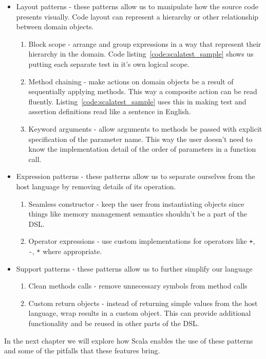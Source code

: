 \begin{itemize}
	\item Layout patterns - these patterns allow us to manipulate how the source code presents visually. Code layout can represent a hierarchy or other relationship between domain objects.
	\begin{enumerate}
		\item Block scope - arrange and group expressions in a way that represent their hierarchy in the domain. Code listing~\ref{code:scalatest_sample} shows us putting each separate test in it's own logical scope.
		\item Method chaining - make actions on domain objects be a result of sequentially applying methods. This way a composite action can be read fluently. Listing~\ref{code:scalatest_sample} uses this in making test and assertion definitions read like a sentence in English.
		\item Keyword arguments - allow arguments to methods be passed with explicit specification of the parameter name. This way the user doesn't need to know the implementation detail of the order of parameters in a function call.
	\end{enumerate}
	\item Expression patterns - these patterns allow us to separate ourselves from the host language by removing details of its operation.
	\begin{enumerate}
		\item Seamless constructor - keep the user from instantiating objects since things like memory management semantics shouldn't be a part of the DSL.
		\item Operator expressions - use custom implementations for operators like \texttt{+}, \texttt{-}, \texttt{*} where appropriate.
	\end{enumerate}
	\item Support patterns - these patterns allow us to further simplify our language
	\begin{enumerate}
		\item Clean methods calls - remove unnecessary symbols from method calls
		\item Custom return objects - instead of returning simple values from the host language, wrap results in a custom object. This can provide additional functionality and be reused in other parts of the DSL.
	\end{enumerate}
\end{itemize}

In the next chapter we will explore how Scala enables the use of these patterns and some of the pitfalls that these features bring.
